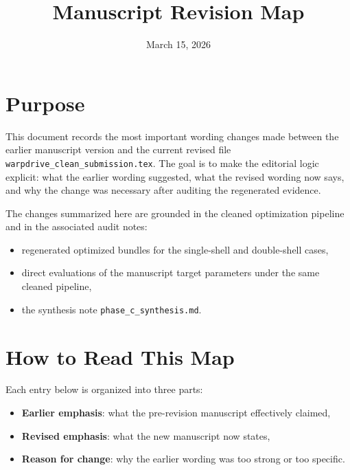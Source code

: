 \documentclass[11pt]{article}
\title{Manuscript Revision Map}
\author{}
\date{March 15, 2026}
\begin{document}
\maketitle

\section*{Purpose}
This document records the most important wording changes made between the earlier manuscript
version and the current revised file \texttt{warpdrive\_clean\_submission.tex}. The goal is to make
the editorial logic explicit: what the earlier wording suggested, what the revised wording now says,
and why the change was necessary after auditing the regenerated evidence.

The changes summarized here are grounded in the cleaned optimization pipeline and in the associated
audit notes:
\begin{itemize}
\item regenerated optimized bundles for the single-shell and double-shell cases,
\item direct evaluations of the manuscript target parameters under the same cleaned pipeline,
\item the synthesis note \texttt{phase\_c\_synthesis.md}.
\end{itemize}

\section*{How to Read This Map}
Each entry below is organized into three parts:
\begin{itemize}
\item \textbf{Earlier emphasis}: what the pre-revision manuscript effectively claimed,
\item \textbf{Revised emphasis}: what the new manuscript now states,
\item \textbf{Reason for change}: why the earlier wording was too strong or too specific.
\end{itemize}
\end{document}
